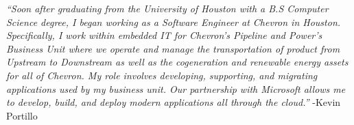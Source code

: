 \begin{appendices}
  \vspace{2cm}

  \textit{``Soon after graduating from the University of Houston with a B.S Computer Science degree, I began working as a Software Engineer at Chevron in Houston. Specifically, I work within embedded IT for Chevron’s Pipeline and Power’s Business Unit where we operate and manage the transportation of product from Upstream to Downstream as well as the cogeneration and renewable energy assets for all of Chevron. My role involves developing, supporting, and migrating applications used by my business unit. Our partnership with Microsoft allows me to develop, build, and deploy modern applications all through the cloud.''}
  \newline\hspace*{12cm} -Kevin Portillo

  
\end{appendices}
